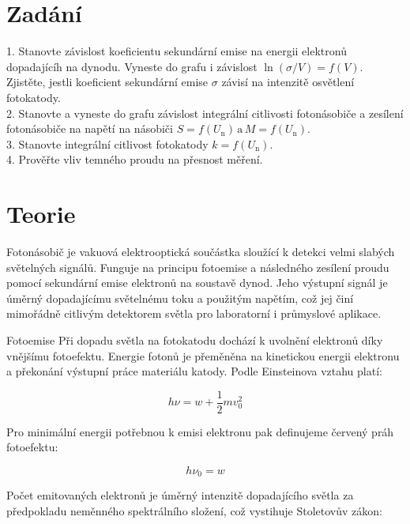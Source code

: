 \documentclass[czech,11pt,a4paper]{article}
\begin{document}
	\begin{multicols}{2}
		\section{Zadání}
		1. Stanovte závislost koeficientu sekundární emise na energii elektronů dopadajícíh na dynodu. Vyneste do grafu i závislost $\ln (\sigma/V) = f(V)$. Zjistěte, jestli koeficient sekundární emise $\sigma$ závisí na intenzitě osvětlení fotokatody.\\
		2. Stanovte a vyneste do grafu závislost integrální citlivosti fotonásobiče a zesílení fotonásobiče na napětí na násobiči $S = f(U_\text{n})\, \text{a} \,M = f(U_\text{n})$.\\
		3. Stanovte integrální citlivost fotokatody $k = f(U_\text{n})$.\\
		4. Prověřte vliv temného proudu na přesnost měření.
		
		
		
		\section{Teorie}
		
		Fotonásobič je vakuová elektrooptická součástka sloužící k detekci velmi slabých světelných signálů. Funguje na principu fotoemise a následného zesílení proudu pomocí sekundární emise elektronů na soustavě dynod. Jeho výstupní signál je úměrný dopadajícímu světelnému toku a použitým napětím, což jej činí mimořádně citlivým detektorem světla pro laboratorní i průmyslové aplikace.
		
		Fotoemise
		Při dopadu světla na fotokatodu dochází k uvolnění elektronů díky vnějšímu fotoefektu. Energie fotonů je přeměněna na kinetickou energii elektronu a překonání výstupní práce materiálu katody. Podle Einsteinova vztahu platí:
		
		\begin{equation} h\nu = w + \frac{1}{2}mv_0^2 \end{equation}
		
		Pro minimální energii potřebnou k emisi elektronu pak definujeme červený práh fotoefektu:
		
		\begin{equation} h\nu_0 = w \end{equation}
		
		Počet emitovaných elektronů je úměrný intenzitě dopadajícího světla za předpokladu neměnného spektrálního složení, což vystihuje Stoletovův zákon:
		

\end{multicols}
\end{document}
